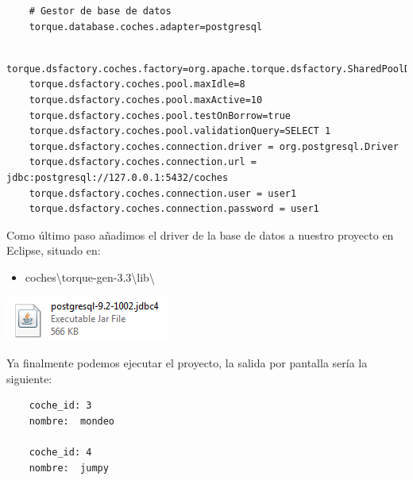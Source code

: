 \documentclass[24pt, a4paper, oneside, spanish]{beamer}
\begin{document}
\begin{frame}
	\begin{lstlisting}
	# Gestor de base de datos
	torque.database.coches.adapter=postgresql
	\end{lstlisting}
	
	\begin{lstlisting}
	torque.dsfactory.coches.factory=org.apache.torque.dsfactory.SharedPoolDataSourceFactory
	torque.dsfactory.coches.pool.maxIdle=8
	torque.dsfactory.coches.pool.maxActive=10
	torque.dsfactory.coches.pool.testOnBorrow=true
	torque.dsfactory.coches.pool.validationQuery=SELECT 1
	torque.dsfactory.coches.connection.driver = org.postgresql.Driver
	torque.dsfactory.coches.connection.url = jdbc:postgresql://127.0.0.1:5432/coches
	torque.dsfactory.coches.connection.user = user1
	torque.dsfactory.coches.connection.password = user1
	\end{lstlisting}
	
		Como último paso añadimos el driver de la base de datos a nuestro proyecto en Eclipse, situado en:
	
	\begin{itemize}
		\item coches\textbackslash torque-gen-3.3\textbackslash lib\textbackslash
	\end{itemize}

	\begin{center}
		\includegraphics[scale=.5]{img/postgresql-file.png}
	\end{center}

	Ya finalmente podemos ejecutar el proyecto, la salida por pantalla sería la siguiente: 
	
	\begin{lstlisting}
	coche_id: 3
	nombre:  mondeo

	coche_id: 4
	nombre:  jumpy
	\end{lstlisting}
\end{frame}
\end{document}
